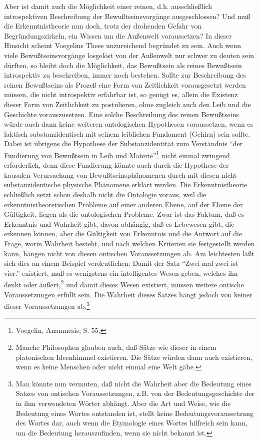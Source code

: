Aber ist damit auch die Möglichkeit einer reinen, d.h. ausschließlich
introspektiven Beschreibung der Bewußtseinsvorgänge ausgeschlossen? Und muß
die Erkenntnistheorie nun doch, trotz der drohenden Gefahr von
Begründungszirkeln, ein Wissen um die Außenwelt voraussetzen? In dieser
Hinsicht scheint Voegelins These unzureichend begründet zu sein. Auch wenn
viele Bewußtseinsvorgänge losgelöst von der Außenwelt nur schwer zu deuten
sein dürften, so bleibt doch die Möglichkeit, das Bewußtsein als reines
Bewußtsein introspektiv zu beschreiben, immer noch bestehen. Sollte zur
Beschreibung des reinen Bewußtseins als Prozeß eine Form von Zeitlichkeit
vorausgesetzt werden müssen, die nicht introspektiv erfahrbar ist, so genügt
es, allein die Existenz dieser Form von Zeitlichkeit zu postulieren, ohne
zugleich auch den Leib und die Geschichte vorauszusetzen. Eine solche
Beschreibung des reinen Bewußtseins würde auch dann keine weiteren
ontologischen Hypothesen voraussetzen, wenn es faktisch substanzidentisch mit
seinem leiblichen Fundament (Gehirn) sein sollte. Dabei ist übrigens die
Hypothese der Substanzidentität zum Verständnis "`der Fundierung von
Bewußtsein in Leib und Materie"'\footnote{Voegelin, Anamnesis, S. 55.} nicht
einmal zwingend erforderlich, denn diese Fundierung könnte auch durch die
Hypothese der kausalen Verursachung von Bewußtseinsphänomenen durch mit diesen
nicht substanzidentische physische Phänomene erklärt werden. Die
Erkenntnistheorie schließlich setzt schon deshalb nicht die Ontologie voraus,
weil die erkenntnistheoretischen Probleme auf einer anderen Ebene, auf der
Ebene der Gültigkeit, liegen als die ontologischen Probleme. Zwar ist das
Faktum, daß es Erkenntnis und Wahrheit gibt, davon abhängig, daß es Lebewesen
gibt, die erkennen können, aber die Gültigkeit von Erkenntnis und die Antwort
auf die Frage, worin Wahrheit besteht, und nach welchen Kriterien sie
festgestellt werden kann, hängen nicht von diesen ontischen Voraussetzungen
ab. Am leichtesten läßt sich dies an einem Beispiel verdeutlichen: Damit der
Satz "`Zwei mal zwei ist vier."' existiert, muß es wenigstens ein intelligentes
Wesen geben, welches ihn denkt oder äußert,\footnote{Manche Philosophen
  glauben auch, daß Sätze wie dieser in einem platonischen Ideenhimmel
  existieren. Die Sätze würden dann auch existieren, wenn es keine Menschen
  oder nicht einmal eine Welt gäbe.}  und damit dieses Wesen existiert, müssen
weitere ontische Voraussetzungen erfüllt sein. Die Wahrheit dieses Satzes
hängt jedoch von keiner dieser Voraussetzungen ab.\footnote{Man könnte nun
  vermuten, daß nicht die Wahrheit aber die Bedeutung eines Satzes von
  ontischen Voraussetzungen, z.B. von der Bedeutungsgeschichte der in ihm
  verwendeten Wörter abhängt. Aber die Art und Weise, wie die Bedeutung eines
  Wortes entstanden ist, stellt keine Bedeutungsvoraussetzung des Wortes dar,
  auch wenn die Etymologie eines Wortes hilfreich sein kann, um die
  Bedeutung herauszufinden, wenn sie nicht bekannt ist.}

